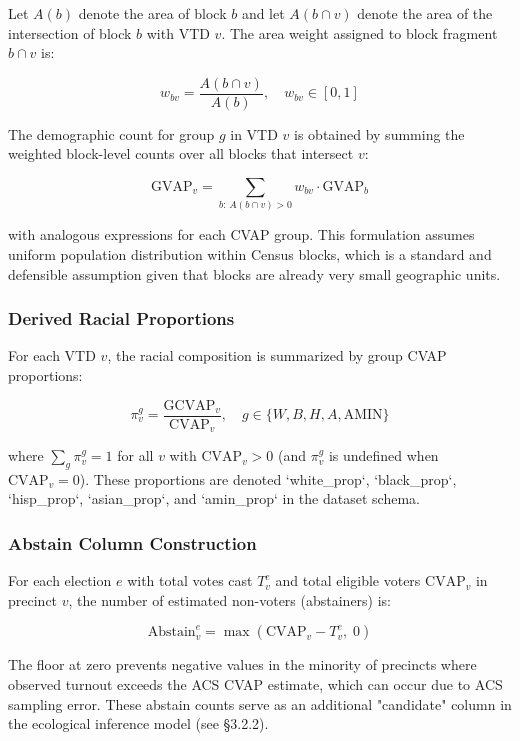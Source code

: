 \documentclass[sn-vancouver,Numbered]{sn-jnl}
\theoremstyle{thmstyleone}%
\theoremstyle{thmstyletwo}%
\theoremstyle{thmstylethree}%
\begin{document}
Let $A(b)$ denote the area of block $b$ and let $A(b \cap v)$ denote the area of the intersection of block $b$ with VTD $v$. The area weight assigned to block fragment $b \cap v$ is:

\begin{equation}
w_{bv} = \frac{A(b \cap v)}{A(b)}, \quad w_{bv} \in [0, 1]
\end{equation}

The demographic count for group $g$ in VTD $v$ is obtained by summing the weighted block-level counts over all blocks that intersect $v$:

\begin{equation}
\text{GVAP}_v = \sum_{b:\, A(b \cap v) > 0} w_{bv} \cdot \text{GVAP}_b  
\end{equation}

with analogous expressions for each CVAP group. This formulation assumes uniform population distribution within Census blocks, which is a standard and defensible assumption given that blocks are already very small geographic units.

\subsubsection{Derived Racial Proportions}
For each VTD $v$, the racial composition is summarized by group CVAP proportions:

\begin{equation}
\pi^g_v = \frac{\text{GCVAP}_v}{\text{CVAP}_v}, \quad g \in \{W, B, H, A, \text{AMIN}\}  
\end{equation}


where $\sum_g \pi^g_v = 1$ for all $v$ with $\text{CVAP}_v > 0$ (and $\pi^g_v$ is undefined when $\text{CVAP}_v = 0$). These proportions are denoted `white_prop`, `black_prop`, `hisp_prop`, `asian_prop`, and `amin_prop` in the dataset schema.

\subsubsection{Abstain Column Construction}
For each election $e$ with total votes cast $T^e_v$ and total eligible voters $\text{CVAP}_v$ in precinct $v$, the number of estimated non-voters (abstainers) is:

\begin{equation}
\text{Abstain}^e_v = \max\!\left(\text{CVAP}_v - T^e_v,\; 0\right)  
\end{equation}


The floor at zero prevents negative values in the minority of precincts where observed turnout exceeds the ACS CVAP estimate, which can occur due to ACS sampling error. These abstain counts serve as an additional "candidate" column in the ecological inference model (see §3.2.2).
\end{document}
